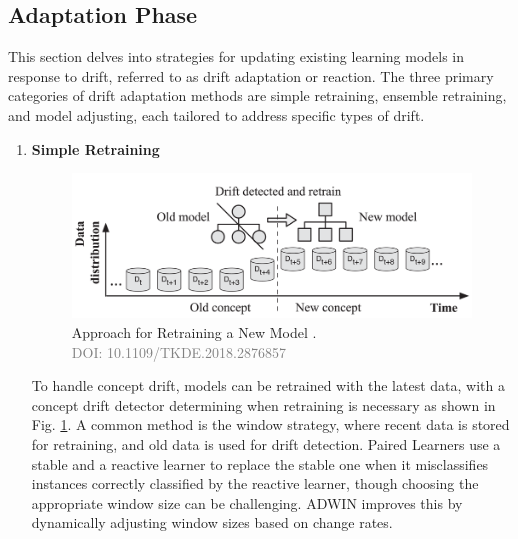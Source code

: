 \subsection{Adaptation Phase}
This section delves into strategies for updating existing learning models in response to drift, referred to as drift adaptation or reaction. The three primary categories of drift adaptation methods are simple retraining, ensemble retraining, and model adjusting, each tailored to address specific types of drift.

\begin{enumerate}[label=\Alph*.]
    \setlength{\itemsep}{0pt}
    \setlength{\parskip}{0pt}
    \item \textbf{Simple Retraining} \\
    \vspace{-3mm}

    \begin{figure}[H]
        \centering
        \includegraphics[width=.9\textwidth]{2_Background/figures/retrain.png}
        \caption{Approach for Retraining a New Model \cite{8496795}. \\ \textcolor{gray}{\fontsize{10}{0}\selectfont DOI: 10.1109/TKDE.2018.2876857}}
        \label{fig:concept-drift-adaptation}
    \end{figure}
    \vspace{-6mm}
    
    To handle concept drift, models can be retrained with the latest data, with a concept drift detector determining when retraining is necessary as shown in Fig. \ref{fig:concept-drift-adaptation}. A common method is the window strategy, where recent data is stored for retraining, and old data is used for drift detection. Paired Learners \cite{bach2008paired} use a stable and a reactive learner to replace the stable one when it misclassifies instances correctly classified by the reactive learner, though choosing the appropriate window size can be challenging. ADWIN \cite{bifet2007learning} improves this by dynamically adjusting window sizes based on change rates.   






\end{enumerate}
